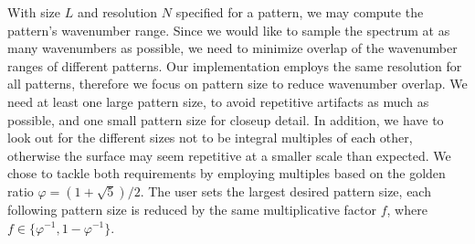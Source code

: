 With size $L$ and resolution $N$ specified for a pattern, we may compute the
pattern's wavenumber range. Since we would like to sample the spectrum at as
many wavenumbers as possible, we need to minimize overlap of the wavenumber
ranges of different patterns. Our implementation employs the same resolution for
all patterns, therefore we focus on pattern
size to reduce wavenumber overlap. We need at least one large pattern size, to
avoid repetitive artifacts as much as possible, and one small pattern size for
closeup detail. In addition, we have to look out for the different sizes not to
be integral multiples of each other, otherwise the surface may seem repetitive
at a smaller scale than expected. We chose to tackle both requirements by
employing multiples based on the golden ratio $\varphi = (1 + \sqrt{5})/2$. The
user sets the largest desired pattern size, each following pattern size is
reduced by the same multiplicative factor $f$, where $f \in \{\varphi^{-1},
1 - \varphi^{-1}\}$.
%
